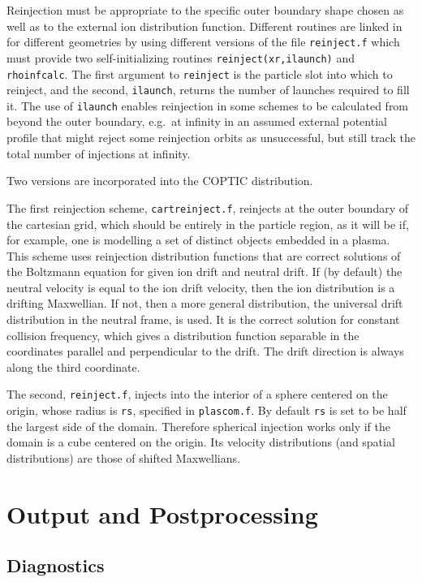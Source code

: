 \documentclass[12pt]{article}
\begin{document}
Reinjection must be appropriate to the specific outer boundary shape
chosen as well as to the external ion distribution function. Different
routines are linked in for different geometries by using different
versions of the file \verb!reinject.f! which must provide two
self-initializing routines \verb!reinject(xr,ilaunch)! and
\verb!rhoinfcalc!. The first argument to \verb!reinject! is the
particle slot into which to reinject, and the second, \verb!ilaunch!,
returns the number of launches required to fill it. The use of
\verb!ilaunch! enables reinjection in some schemes to be calculated
from beyond the outer boundary, e.g.\ at infinity in an assumed
external potential profile that might reject some reinjection orbits
as unsuccessful, but still track the total number of injections at
infinity.

Two versions are incorporated into the COPTIC distribution. 

The first reinjection scheme,
\verb!cartreinject.f!, reinjects at the outer boundary of the
cartesian grid, which should be entirely in the particle region, as it
will be if, for example, one is modelling a set of distinct objects
embedded in a plasma. This scheme uses reinjection distribution
functions that are correct solutions of the Boltzmann equation for
given ion drift and neutral drift. If (by default) the neutral
velocity is equal to the ion drift velocity, then the ion distribution
is a drifting Maxwellian. If not, then a more general distribution,
the universal drift distribution in the neutral frame, is used. It is
the correct solution for constant collision frequency, which gives a
distribution function separable in the coordinates parallel and
perpendicular to the drift. The drift direction is always along the
third coordinate.

The second, \verb!reinject.f!, injects into the
interior of a sphere centered on the origin, whose radius is
\verb!rs!, specified in \verb!plascom.f!. By default \verb!rs! is set
to be half the largest side of the domain. Therefore spherical
injection works only if the domain is a cube centered on the origin.
Its velocity distributions (and spatial distributions) are those of
shifted Maxwellians.

\section{Output and Postprocessing}

\subsection{Diagnostics}
\end{document}

